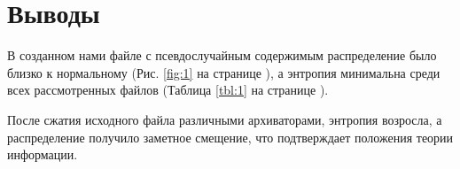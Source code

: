\section{Выводы}

В созданном нами файле с псевдослучайным содержимым распределение было близко к нормальному (Рис. \ref{fig:1} на странице \pageref{fig:1}), а энтропия минимальна среди всех рассмотренных файлов (Таблица \ref{tbl:1} на странице \pageref{tbl:1}).

После сжатия исходного файла различными архиваторами, энтропия возросла, а распределение получило заметное смещение, что подтверждает положения теории информации.